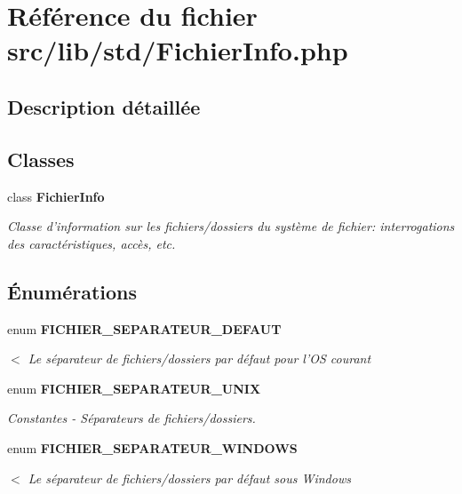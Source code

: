 \section{Référence du fichier src/lib/std/FichierInfo.php}
\label{_fichier_info_8php}


\subsection{Description détaillée}


\subsection*{Classes}
\begin{CompactItemize}
\item 
class {\bf FichierInfo}
\begin{CompactList}\small\item\em Classe d'information sur les fichiers/dossiers du système de fichier: interrogations des caractéristiques, accès, etc. \item\end{CompactList}\end{CompactItemize}
\subsection*{Énumérations}
\begin{Indent}{\bf }\par
\begin{CompactItemize}
\item 
enum {\bf FICHIER\_\-SEPARATEUR\_\-DEFAUT} 
\begin{CompactList}\small\item\em $<$ Le séparateur de fichiers/dossiers par défaut pour l'OS courant \item\end{CompactList}\item 
enum {\bf FICHIER\_\-SEPARATEUR\_\-UNIX} 
\begin{CompactList}\small\item\em Constantes - Séparateurs de fichiers/dossiers. \item\end{CompactList}\item 
enum {\bf FICHIER\_\-SEPARATEUR\_\-WINDOWS} 
\begin{CompactList}\small\item\em $<$ Le séparateur de fichiers/dossiers par défaut sous Windows \item\end{CompactList}\end{CompactItemize}
\end{Indent}


